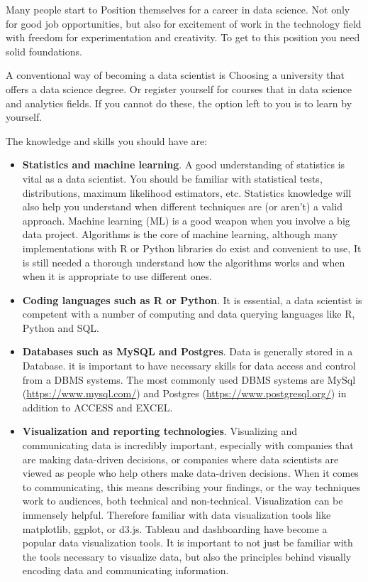 \documentclass[
]{book}
\providecommand{\tightlist}{%
  \setlength{\itemsep}{0pt}\setlength{\parskip}{0pt}}
\begin{document}
Many people start to Position themselves for a career in data science. Not only for good job opportunities, but also for excitement of work in the technology field with freedom for experimentation and creativity. To get to this position you need solid foundations.

A conventional way of becoming a data scientist is Choosing a university that offers a data science degree. Or register yourself for courses that in data science and analytics fields. If you cannot do these, the option left to you is to learn by yourself.

The knowledge and skills you should have are:

\begin{itemize}
\tightlist
\item
  \textbf{Statistics and machine learning}. A good understanding of statistics is vital as a data scientist. You should be familiar with statistical tests, distributions, maximum likelihood estimators, etc. Statistics knowledge will also help you understand when different techniques are (or aren't) a valid approach. Machine learning (ML) is a good weapon when you involve a big data project. Algorithms is the core of machine learning, although many implementations with R or Python libraries do exist and convenient to use, It is still needed a thorough understand how the algorithms works and when when it is appropriate to use different ones.
\item
  \textbf{Coding languages such as R or Python}. It is essential, a data scientist is competent with a number of computing and data querying languages like R, Python and SQL.
\item
  \textbf{Databases such as MySQL and Postgres}. Data is generally stored in a Database. it is important to have necessary skills for data access and control from a DBMS systems. The most commonly used DBMS systems are MySql (\url{https://www.mysql.com/}) and Postgres (\url{https://www.postgresql.org/}) in addition to ACCESS and EXCEL.
\item
  \textbf{Visualization and reporting technologies}. Visualizing and communicating data is incredibly important, especially with companies that are making data-driven decisions, or companies where data scientists are viewed as people who help others make data-driven decisions. When it comes to communicating, this means describing your findings, or the way techniques work to audiences, both technical and non-technical. Visualization can be immensely helpful. Therefore familiar with data visualization tools like matplotlib, ggplot, or d3.js. Tableau and dashboarding have become a popular data visualization tools. It is important to not just be familiar with the tools necessary to visualize data, but also the principles behind visually encoding data and communicating information.

\end{itemize}
\end{document}
